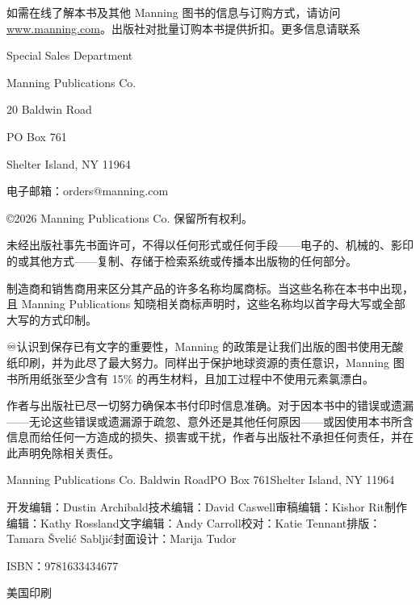 如需在线了解本书及其他 Manning 图书的信息与订购方式，请访问 \href{http://www.manning.com}{www.manning.com}。出版社对批量订购本书提供折扣。更多信息请联系

Special Sales Department

Manning Publications Co.

20 Baldwin Road

PO Box 761

Shelter Island, NY 11964

电子邮箱：orders@manning.com

©2026 Manning Publications Co. 保留所有权利。

未经出版社事先书面许可，不得以任何形式或任何手段——电子的、机械的、影印的或其他方式——复制、存储于检索系统或传播本出版物的任何部分。

制造商和销售商用来区分其产品的许多名称均属商标。当这些名称在本书中出现，且 Manning Publications 知晓相关商标声明时，这些名称均以首字母大写或全部大写的方式印制。

♾️认识到保存已有文字的重要性，Manning 的政策是让我们出版的图书使用无酸纸印刷，并为此尽了最大努力。同样出于保护地球资源的责任意识，Manning 图书所用纸张至少含有 15\% 的再生材料，且加工过程中不使用元素氯漂白。

作者与出版社已尽一切努力确保本书付印时信息准确。对于因本书中的错误或遗漏——无论这些错误或遗漏源于疏忽、意外还是其他任何原因——或因使用本书所含信息而给任何一方造成的损失、损害或干扰，作者与出版社不承担任何责任，并在此声明免除相关责任。

Manning Publications Co. Baldwin Road\newline PO Box 761\newline Shelter Island, NY 11964

开发编辑：Dustin Archibald\newline 技术编辑：David Caswell\newline 审稿编辑：Kishor Rit\newline 制作编辑：Kathy Rossland\newline 文字编辑：Andy Carroll\newline 校对：Katie Tennant\newline 排版：Tamara Švelić Sabljić\newline 封面设计：Marija Tudor

ISBN：9781633434677

美国印刷
